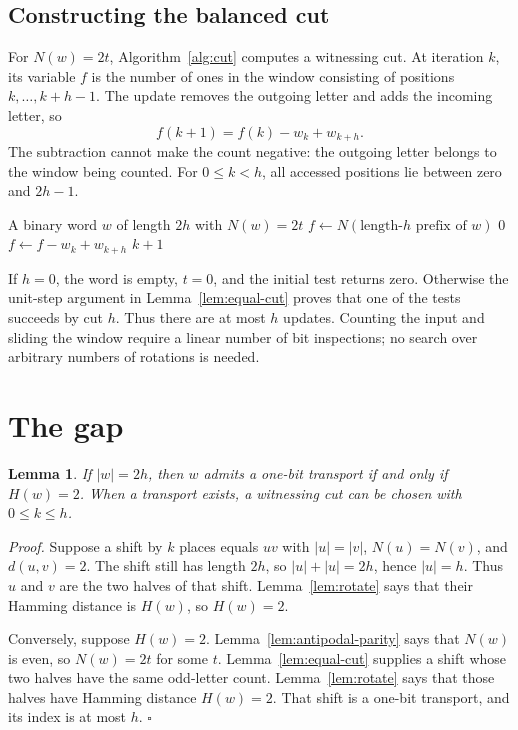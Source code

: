 \documentclass[11pt,letterpaper]{article}
\newtheorem{lemma}[theorem]{Lemma}
\newenvironment{proof}{\noindent\textit{Proof.}}{\hfill\(\square\)}
\begin{document}
\subsection{Constructing the balanced cut}

For \(N(w)=2t\), Algorithm~\ref{alg:cut} computes a witnessing cut. At iteration
\(k\), its variable \(f\) is the number of ones in the window consisting of
positions \(k,\ldots,k+h-1\). The update removes the outgoing letter and adds
the incoming letter, so
\[
f(k+1)=f(k)-w_k+w_{k+h}.
\]
The subtraction cannot make the count negative: the outgoing letter belongs
to the window being counted. For \(0\le k<h\), all accessed positions lie
between zero and \(2h-1\).

\begin{algorithm}[tbp]
\caption{First balanced cut of a word with \(N(w)=2t\)}
\label{alg:cut}
\begin{algorithmic}[1]
\Require A binary word \(w\) of length \(2h\) with \(N(w)=2t\)
\State \(f\gets N(\text{length-}h\text{ prefix of }w)\)
  \State \Return \(0\)
\EndIf
{}
  \State \(f\gets f-w_k+w_{k+h}\)
    \State \Return \(k+1\)
  \EndIf
\EndFor
\end{algorithmic}
\end{algorithm}

If \(h=0\), the word is empty, \(t=0\), and the initial test returns zero.
Otherwise the unit-step argument in Lemma~\ref{lem:equal-cut} proves that one
of the tests succeeds by cut \(h\). Thus there are at most \(h\) updates.
Counting the input and sliding the window require a linear number of bit
inspections; no search over arbitrary numbers of rotations is needed.

\section{The gap}

\begin{lemma}
\label{lem:iff-two}
If \(|w|=2h\), then \(w\) admits a one-bit transport if and only if \(H(w)=2\).
When a transport exists, a witnessing cut can be chosen with \(0\le k\le h\).
\end{lemma}

\begin{proof}
Suppose a shift by \(k\) places equals \(uv\) with \(|u|=|v|\), \(N(u)=N(v)\), and \(d(u,v)=2\). The shift still has length \(2h\), so \(|u|+|u|=2h\), hence \(|u|=h\). Thus \(u\) and \(v\) are the two halves of that shift. Lemma~\ref{lem:rotate} says that their Hamming distance is \(H(w)\), so \(H(w)=2\).

Conversely, suppose \(H(w)=2\). Lemma~\ref{lem:antipodal-parity} says that \(N(w)\) is even, so \(N(w)=2t\) for some \(t\). Lemma~\ref{lem:equal-cut} supplies a shift whose two halves have the same odd-letter count. Lemma~\ref{lem:rotate} says that those halves have Hamming distance \(H(w)=2\). That shift is a one-bit transport, and its index is at most \(h\).
\end{proof}
\end{document}
